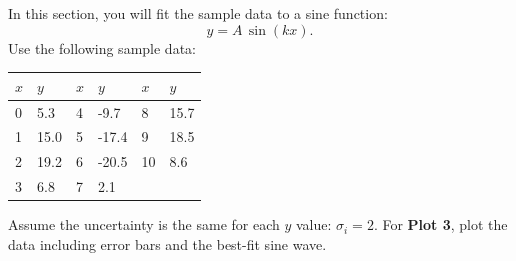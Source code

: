 In this section, you will fit the sample data to a sine function:
\begin{displaymath}
 y = A \, \sin( k x). 
\end{displaymath}
Use the following sample data:\\
\begin{center}
\begin{tabular}{|ll| ll|ll|}
\hline
$x$ & $y$ & $x$ & $y$ & $x$ & $y$\\
\hline
0  & 5.3    & 4  & -9.7   & 8  & 15.7  \\
1  & 15.0   & 5  & -17.4  & 9  & 18.5  \\
2  & 19.2   & 6  & -20.5  & 10 & 8.6   \\
3  & 6.8    & 7  &  2.1   & &  \\
\hline
\end{tabular}
\end{center}
Assume the uncertainty is the same for each $y$ value: $\sigma_i = 2$.
For {\bf Plot 3}, plot the data including error bars and the best-fit
sine wave.  





















